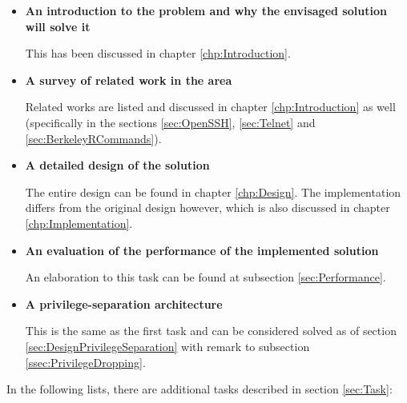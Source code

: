 \documentclass[10pt,a4paper,titlepage,twoside,english,final]{zhawreprt}
\begin{document}
\begin{itemize}
\item \textbf{An introduction to the problem and why the envisaged solution will solve it}

This has been discussed in chapter \ref{chp:Introduction}.

\item \textbf{A survey of related work in the area}

Related works are listed and discussed in chapter \ref{chp:Introduction} as well (specifically in the sections \ref{sec:OpenSSH}, \ref{sec:Telnet} and \ref{sec:BerkeleyRCommands}).

\item \textbf{A detailed design of the solution}

The entire design can be found in chapter \ref{chp:Design}.
The implementation differs from the original design however, which is also discussed in chapter \ref{chp:Implementation}.

\item \textbf{An evaluation of the performance of the implemented solution}

An elaboration to this task can be found at subsection \ref{sec:Performance}.

\item \textbf{A privilege-separation architecture}

This is the same as the first task and can be considered solved as of section \ref{sec:DesignPrivilegeSeparation} with remark to subsection \ref{ssec:PrivilegeDropping}.
\end{itemize}

In the following lists, there are additional tasks described in section \ref{sec:Task}:
\end{document}
